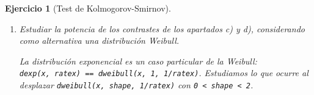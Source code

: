 \documentclass[
]{book}
\newenvironment{Shaded}{\begin{snugshade}}{\end{snugshade}}
\newcommand{\AttributeTok}[1]{\textcolor[rgb]{0.77,0.63,0.00}{#1}}
\newcommand{\CommentTok}[1]{\textcolor[rgb]{0.56,0.35,0.01}{\textit{#1}}}
\newcommand{\ConstantTok}[1]{\textcolor[rgb]{0.00,0.00,0.00}{#1}}
\newcommand{\DecValTok}[1]{\textcolor[rgb]{0.00,0.00,0.81}{#1}}
\newcommand{\FunctionTok}[1]{\textcolor[rgb]{0.00,0.00,0.00}{#1}}
\newcommand{\NormalTok}[1]{#1}
\newcommand{\StringTok}[1]{\textcolor[rgb]{0.31,0.60,0.02}{#1}}
\theoremstyle{break}
\newtheorem{exercise}{Ejercicio}[chapter]
\theoremstyle{nonumberplain}
\renewcommand{\CommentTok}[1]{\textcolor[rgb]{0.41,0.41,0.41}{\texttt{#1}}}
\begin{document}
\begin{exercise}[Test de Kolmogorov-Smirnov]
\begin{enumerate}
\begin{verbatim}
## 
## Proporción de rechazos al 1% = 0.008 
## Proporción de rechazos al 5% = 0.058 
## Proporción de rechazos al 10% = 0.106
\end{verbatim}

  Análisis de los p-valores:

\begin{Shaded}
\begin{Highlighting}[]
\FunctionTok{hist}\NormalTok{(pvalor, }\AttributeTok{freq=}\ConstantTok{FALSE}\NormalTok{)}
\FunctionTok{abline}\NormalTok{(}\AttributeTok{h=}\DecValTok{1}\NormalTok{, }\AttributeTok{lty=}\DecValTok{2}\NormalTok{)   }\CommentTok{\# curve(dunif(x,0,1), add=TRUE)}
\end{Highlighting}
\end{Shaded}

  \begin{center}\texttt{[image: 07-Monte\_Carlo\_files/figure-latex/unnamed-chunk-60-1]} \end{center}

\begin{Shaded}
\begin{Highlighting}[]
\CommentTok{\# Distribución empírica}
\FunctionTok{curve}\NormalTok{(}\FunctionTok{ecdf}\NormalTok{(pvalor)(x), }\AttributeTok{type =} \StringTok{"s"}\NormalTok{, }\AttributeTok{lwd =} \DecValTok{2}\NormalTok{, }
      \AttributeTok{main =} \StringTok{\textquotesingle{}Tamaño del contraste\textquotesingle{}}\NormalTok{, }\AttributeTok{ylab =} \StringTok{\textquotesingle{}Proporción de rechazos\textquotesingle{}}\NormalTok{, }
      \AttributeTok{xlab =} \StringTok{\textquotesingle{}Nivel de significación\textquotesingle{}}\NormalTok{)}
\FunctionTok{abline}\NormalTok{(}\AttributeTok{a=}\DecValTok{0}\NormalTok{, }\AttributeTok{b=}\DecValTok{1}\NormalTok{, }\AttributeTok{lty=}\DecValTok{2}\NormalTok{)   }\CommentTok{\# curve(punif(x, 0, 1), add = TRUE) }
\end{Highlighting}
\end{Shaded}

  \begin{center}\texttt{[image: 07-Monte\_Carlo\_files/figure-latex/unnamed-chunk-60-2]} \end{center}
\item
  Estudiar la potencia de los contrastes de los apartados c) y d),
  considerando como alternativa una distribución Weibull.

  La distribución exponencial es un caso particular de la Weibull:
  \texttt{dexp(x,\ ratex)\ ==\ dweibull(x,\ 1,\ 1/ratex)}.
  Estudiamos lo que ocurre al desplazar \texttt{dweibull(x,\ shape,\ 1/ratex)} con \texttt{0\ \textless{}\ shape\ \textless{}\ 2}.


\end{enumerate}
\end{exercise}
\end{document}
